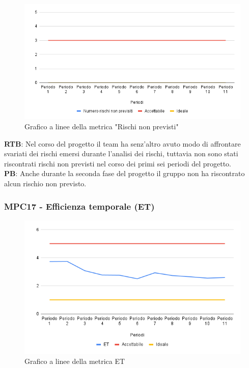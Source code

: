 \documentclass[10pt]{article}
\begin{document}
\begin{justify}
\begin{figure}[H]
  \centering
  \includegraphics[width=0.9\linewidth]{RNP.png}
  \caption{Grafico a linee della metrica "Rischi non previsti"}
  \label{fig:RNPchart}
\end{figure}

\textbf{RTB}: Nel corso del progetto il team ha senz'altro avuto modo di affrontare svariati dei rischi emersi durante l'analisi dei rischi, tuttavia non sono stati
riscontrati rischi non previsti nel corso dei primi sei periodi del progetto.\\

\noindent
\textbf{PB}: Anche durante la seconda fase del progetto il gruppo non ha riscontrato alcun rischio non previsto.\\


\subsubsection{MPC17 - Efficienza temporale (ET)}

\begin{figure}[H]
  \centering
  \includegraphics[width=0.9\linewidth]{ET.png}
  \caption{Grafico a linee della metrica ET}
  \label{fig:ETchart}
\end{figure}


\end{justify}
\end{document}
